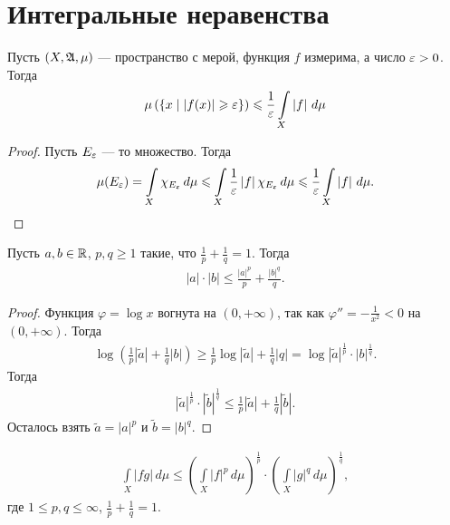 \section{Интегральные неравенства}
\begin{thm}
 Пусть $(X, \mathfrak{A}, \mu)$ --- пространство с мерой, функция $f$ измерима, а число $\varepsilon > 0$. Тогда \begin{align*}
  \mu \left( \left\{ x \mid \left| f(x) \right| \geqslant \varepsilon \right\} \right) \leqslant \frac{1}{\varepsilon} \int\limits_{X} \left| f \right| \, d\mu  
 \end{align*} 
\end{thm}
\begin{proof}
 Пусть $E_{\varepsilon}$ --- то множество. Тогда \begin{align*}
  \mu(E_{\varepsilon}) = \int\limits_{X} \chi_{E_{\varepsilon}} \, d\mu  \leqslant \int\limits_{X} \frac{1}{\varepsilon} \left| f \right| \chi_{E_{\varepsilon}} \, d\mu  \leqslant \frac{1}{\varepsilon} \int\limits_{X} \left| f \right| \, d\mu  
 .\end{align*} 
\end{proof}
\begin{thm}
 Пусть $a, b \in \mathbb{R}$, $p,q \geqslant 1$ такие, что $\frac{1}{p} + \frac{1}{q} = 1$. Тогда \begin{align*}
  \left| a \right| \cdot \left| b \right| \leqslant \frac{\left| a \right|^{p}}{p} + \frac{\left| b \right|^{q}}{q}
 .\end{align*} 
\end{thm}
\begin{proof}
 Функция $\varphi = \log x$ вогнута на $(0, +\infty)$, так как $\varphi'' = -\frac{1}{x^{2}} < 0$ на $(0, +\infty)$. Тогда \begin{align*}
  \log \left( \frac{1}{p}\left| \tilde a \right| + \frac{1}{q} \left| b \right| \right) \geqslant \frac{1}{p}\log \left| \tilde a \right| + \frac{1}{q}\left| q \right| = \log \left| \tilde a \right|^{\frac{1}{p}} \cdot \left| b \right|^{\frac{1}{q}}
 .\end{align*} Тогда \begin{align*}
  \left| \tilde a \right|^{\frac{1}{p}} \cdot \left| \tilde b \right|^{\frac{1}{q}} \leqslant \frac{1}{p}\left| \tilde a \right| + \frac{1}{q} \left| \tilde b \right|
 .\end{align*} Осталось взять $\tilde a = \left| a \right|^{p}$ и $\tilde b = \left| b \right|^{q}$.
\end{proof}
\begin{thm}
 \begin{align*}
  \int\limits_{X} \left| fg \right| \, d\mu  \leqslant \left( \int\limits_{X} \left| f \right|^{p} \, d\mu   \right)^{\frac{1}{p}} \cdot \left( \int\limits_{X} \left| g \right|^{q} \, d\mu   \right)^{\frac{1}{q}}
 ,\end{align*}  где $1 \leqslant p, q \leqslant \infty$, $\frac{1}{p} + \frac{1}{q} = 1$.
\end{thm}
